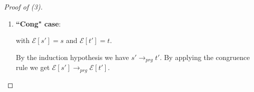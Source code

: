 \documentclass[11pt]{article} %
\begin{document}
\begin{proof}[Proof of (3)]
\begin{enumerate}
\begin{itemize}
\begin{enumerate}
\end{enumerate}

\item \underline{Case 2}: $r = `` q'.des(p_1, ..., p_k) = t' "$, $q'$ is hole pattern:
\begin{equation*}
\langle r \rangle^{extract\_outer\_des} = \big\langle r, \emptyset \big\rangle
\end{equation*}
It follows that $r = `` q' = s "$, thus $(q, s') \in \textrm{Rules}(prg)$.

\item \underline{Case 3}: $r = `` q' = t'$, $q'$ is hole pattern:

The argument here is identical to that in Case 2.

\end{itemize}

\item \textbf{``Cong" case}:

\begin{prooftree}
\end{prooftree}

with $\mathcal{E}[s'] = s$ and $\mathcal{E}[t'] = t$.

By the induction hypothesis we have $s' \longrightarrow_{prg} t'$. By applying the congruence rule we get $\mathcal{E}[s'] \longrightarrow_{prg} \mathcal{E}[t']$.

\end{enumerate}

\end{proof}
\end{document}
